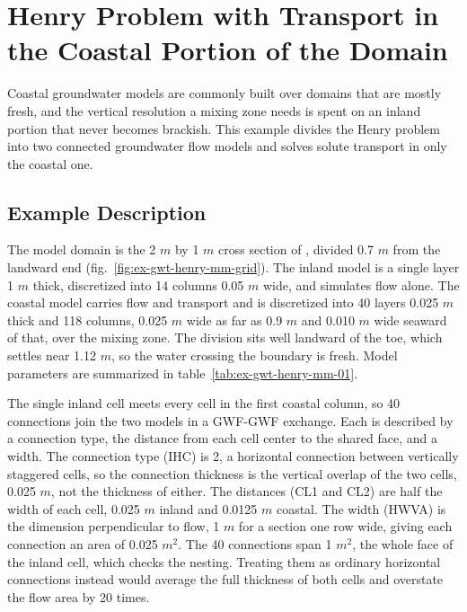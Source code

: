 \section{Henry Problem with Transport in the Coastal Portion of the Domain}

Coastal groundwater models are commonly built over domains that are mostly fresh, and the vertical resolution a mixing zone needs is spent on an inland portion that never becomes brackish. This example divides the Henry problem \citep{henry1964} into two connected groundwater flow models and solves solute transport in only the coastal one.

\subsection{Example Description}

The model domain is the 2 $m$ by 1 $m$ cross section of \cite{henry1964}, divided 0.7 $m$ from the landward end (fig.~\ref{fig:ex-gwt-henry-mm-grid}). The inland model is a single layer 1 $m$ thick, discretized into 14 columns 0.05 $m$ wide, and simulates flow alone. The coastal model carries flow and transport and is discretized into 40 layers 0.025 $m$ thick and 118 columns, 0.025 $m$ wide as far as 0.9 $m$ and 0.010 $m$ wide seaward of that, over the mixing zone. The division sits well landward of the toe, which settles near 1.12 $m$, so the water crossing the boundary is fresh. Model parameters are summarized in table~\ref{tab:ex-gwt-henry-mm-01}.

The single inland cell meets every cell in the first coastal column, so 40 connections join the two models in a GWF-GWF exchange. Each is described by a connection type, the distance from each cell center to the shared face, and a width. The connection type (IHC) is 2, a horizontal connection between vertically staggered cells, so the connection thickness is the vertical overlap of the two cells, 0.025 $m$, not the thickness of either. The distances (CL1 and CL2) are half the width of each cell, 0.025 $m$ inland and 0.0125 $m$ coastal. The width (HWVA) is the dimension perpendicular to flow, 1 $m$ for a section one row wide, giving each connection an area of 0.025 $m^2$. The 40 connections span 1 $m^2$, the whole face of the inland cell, which checks the nesting. Treating them as ordinary horizontal connections instead would average the full thickness of both cells and overstate the flow area by 20 times.

